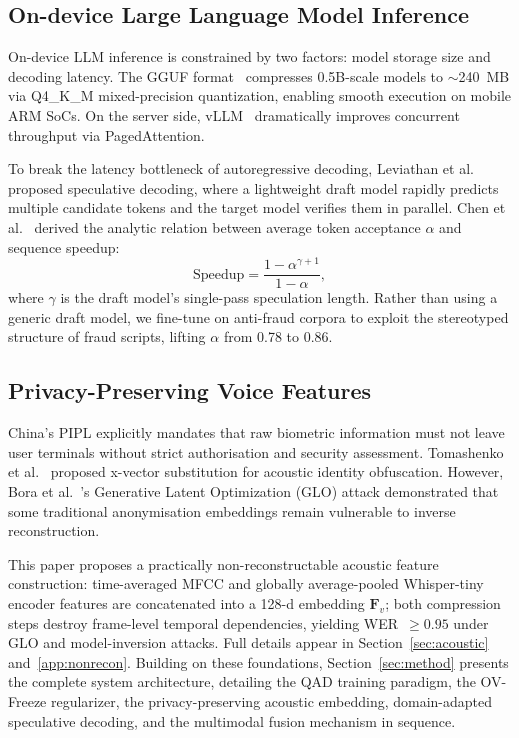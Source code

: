 \documentclass[final,5p,times,number]{elsarticle}
\begin{document}
\subsection{On-device Large Language Model Inference}

On-device LLM inference is constrained by two factors: model storage size and decoding latency. The GGUF format~\cite{17} compresses 0.5B-scale models to $\sim$240~MB via Q4\_K\_M mixed-precision quantization, enabling smooth execution on mobile ARM SoCs. On the server side, vLLM~\cite{18} dramatically improves concurrent throughput via PagedAttention.

To break the latency bottleneck of autoregressive decoding, Leviathan et al.~\cite{20} proposed speculative decoding, where a lightweight draft model rapidly predicts multiple candidate tokens and the target model verifies them in parallel. Chen et al.~\cite{21} derived the analytic relation between average token acceptance $\alpha$ and sequence speedup:
\begin{equation}
\label{eq:speedup}
\text{Speedup} = \frac{1-\alpha^{\gamma+1}}{1-\alpha},
\end{equation}
where $\gamma$ is the draft model's single-pass speculation length. Rather than using a generic draft model, we fine-tune on anti-fraud corpora to exploit the stereotyped structure of fraud scripts, lifting $\alpha$ from 0.78 to 0.86.

\subsection{Privacy-Preserving Voice Features}

China's PIPL explicitly mandates that raw biometric information must not leave user terminals without strict authorisation and security assessment. Tomashenko et al.~\cite{22} proposed x-vector substitution for acoustic identity obfuscation. However, Bora et al.~\cite{23}'s Generative Latent Optimization (GLO) attack demonstrated that some traditional anonymisation embeddings remain vulnerable to inverse reconstruction.

This paper proposes a practically non-reconstructable acoustic feature construction: time-averaged MFCC and globally average-pooled Whisper-tiny encoder features are concatenated into a 128-d embedding $\bm{F}_v$; both compression steps destroy frame-level temporal dependencies, yielding WER~$\ge 0.95$ under GLO and model-inversion attacks. Full details appear in Section~\ref{sec:acoustic} and~\ref{app:nonrecon}. Building on these foundations, Section~\ref{sec:method} presents the complete system architecture, detailing the QAD training paradigm, the OV-Freeze regularizer, the privacy-preserving acoustic embedding, domain-adapted speculative decoding, and the multimodal fusion mechanism in sequence.
\end{document}
